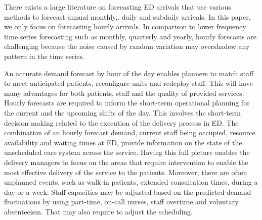 \documentclass[]{elsarticle} %
\begin{document}
There exists a large literature on forecasting ED arrivals that use various methods to forecast annual\citep{tandberg1994time} monthly,\citep{chen2011long, mai2015predicting}. daily\citep{rostami2020anticipating, park2019144} and subdaily \citep{schweigler2009forecasting, cheng2021forecasting} arrivals. In this paper, we only focus on forecasting hourly arrivals. In comparison to lower frequency time series forecasting such as monthly, quarterly and yearly, hourly forecasts are challenging because the noise caused by random variation may overshadow any pattern in the time series.

An accurate demand forecast by hour of the day enables planners to match staff to meet anticipated patients, reconfigure units and redeploy staff. This will have many advantages for both patients, staff and the quality of provided services. Hourly forecasts are required to inform the short-term operational planning for the current and the upcoming shifts of the day. This involves the short-term decision making related to the execution of the delivery process in ED.
The combination of an hourly forecast demand, current staff being occupied, resource availability and waiting times at ED, provide information on the state of the unscheduled care system across the service. Having this full picture enables the delivery managers to focus on the areas that require intervention to enable the most effective delivery of the service to the patients. Moreover, there are often unplanned events, such as walk-in patients, extended consultation times, during a day or a week. Staff capacities may be adjusted based on the predicted demand fluctuations by using part-time, on-call nurses, staff overtime and voluntary absenteeism. That may also require to adjust the scheduling.
\end{document}
